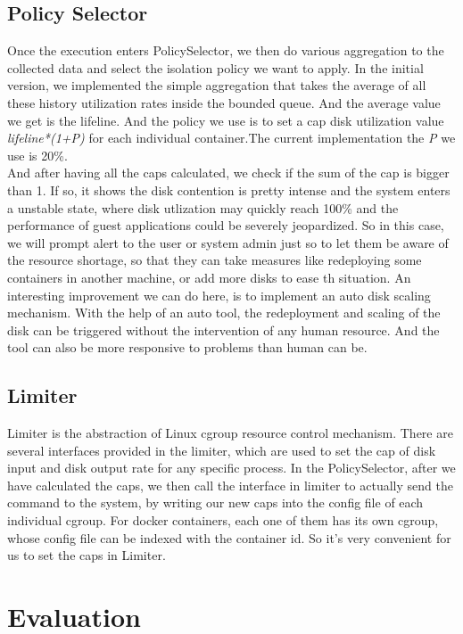 \documentclass[10pt, conference,compsoc]{IEEEtran}
\begin{document}
\subsection{Policy Selector}
Once the execution enters PolicySelector, we then do various aggregation to the collected data and select the isolation policy we want to apply. In the initial version, we implemented the simple aggregation that takes the average of all these history utilization rates inside the bounded queue. And the average value we get is the lifeline. And the policy we use is to set a cap disk utilization value \textit{lifeline*(1+P)} for each individual container.The current implementation the \textit{P} we use is 20\%. \\

And after having all the caps calculated, we check if the sum of the cap is bigger than 1. If so, it shows the disk contention is pretty intense and the system enters a unstable state, where disk utlization may quickly reach 100\% and the performance of guest applications could be severely jeopardized. So in this case, we will prompt alert to the user or system admin just so to let them be aware of the resource shortage, so that they can take measures like redeploying some containers in another machine, or add more disks to ease th situation. An interesting improvement we can do here, is to implement an auto disk scaling mechanism. With the help of an auto tool, the redeployment and scaling of the disk can be triggered without the intervention of any human resource. And the tool can also be more responsive to problems than human can be.\\


\subsection{Limiter}
Limiter is the abstraction of Linux cgroup resource control mechanism. There are several interfaces provided in the limiter, which are used to set the cap of disk input and disk output rate for any specific process. In the PolicySelector, after we have calculated the caps, we then call the interface in limiter to actually send the command to the system, by writing our new caps into the config file of each individual cgroup. For docker containers, each one of them has its own cgroup, whose config file can be indexed with the container id. So it's very convenient for us to set the caps in Limiter.

\section{Evaluation}
\end{document}
